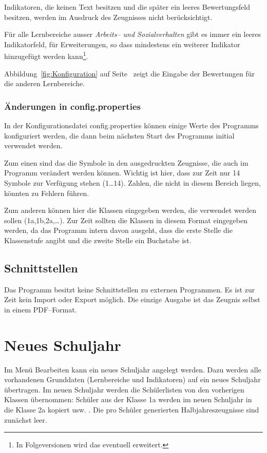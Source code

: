 \documentclass[a4paper,notitlepage,parskip]{scrartcl}
\newcommand\ott{\normalfont\ttfamily}
\begin{document}
Indikatoren, die keinen Text besitzen und die später ein leeres Bewertungsfeld besitzen, werden im Ausdruck des Zeugnisses nicht berücksichtigt.

Für alle Lernbereiche ausser \emph{Arbeits-- und Sozialverhalten} gibt es immer ein leeres Indikatorfeld, für Erweiterungen, so dass mindestens ein weiterer Indikator hinzugefügt werden kann\footnote{In Folgeversionen wird das eventuell erweitert.}.

Abbildung~\ref{fig:Konfiguration} auf Seite~\pageref{fig:Konfiguration} zeigt die Eingabe der Bewertungen für die anderen Lernbereiche.

\subsubsection{Änderungen in {\ott config.properties}}
\label{configKlassen}
In der Konfigurationsdatei {\ott config.properties} können einige Werte des Programms konfiguriert werden, die dann beim nächsten Start des Programms initial verwendet werden.

Zum einen sind das die Symbole in den ausgedruckten Zeugnisse, die auch im Programm verändert werden können.
Wichtig ist hier, dass zur Zeit nur 14 Symbole zur Verfügung stehen (1\dots14). Zahlen, die nicht in diesem Bereich liegen, könnten zu Fehlern führen.

Zum anderen können hier die Klassen eingegeben werden, die verwendet werden sollen (1a,1b,2a,\dots).
Zur Zeit sollten die Klassen in diesem Format eingegeben werden, da das Programm intern davon ausgeht, dass die erste Stelle die Klassenstufe angibt und die zweite Stelle ein Buchstabe ist.

\subsection{Schnittstellen}
Das Programm besitzt keine Schnittstellen zu externen Programmen. Es ist zur Zeit kein Import oder Export möglich.
Die einzige Ausgabe ist das Zeugnis selbst in einem PDF--Format.

\section{Neues Schuljahr}
Im Menü {\ott Bearbeiten} kann ein neues Schuljahr angelegt werden. Dazu werden alle vorhandenen Grunddaten (Lernbereiche und Indikatoren) auf ein neues Schuljahr übertragen.
Im neuen Schuljahr werden die Schülerlisten von den vorherigen Klassen übernommen:
Schüler aus der Klasse 1a werden im neuen Schuljahr in die Klasse 2a kopiert usw. .
Die pro Schüler generierten Halbjahreszeugnisse sind zunächst leer.
\end{document}
